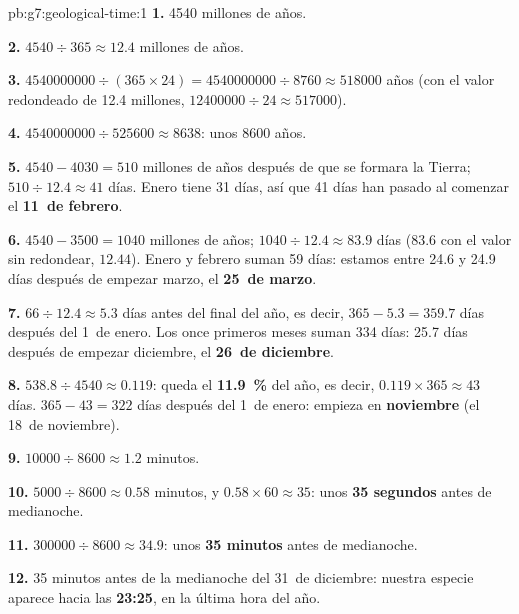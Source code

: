 \begin{solution}{pb:g7:geological-time:1}
\textbf{1.} \num{4540} millones de años.

\textbf{2.} $4540 \div 365 \approx 12.4$ millones de años.

\textbf{3.} $\num{4540000000} \div (365 \times 24) = \num{4540000000}
\div 8760 \approx \num{518000}$ años (con el valor redondeado de \num{12.4}
millones, $\num{12400000} \div 24 \approx \num{517000}$).

\textbf{4.} $\num{4540000000} \div \num{525600} \approx 8638$: unos
\num{8600} años.

\textbf{5.} $4540 - 4030 = 510$ millones de años después de que se formara
la Tierra; $510 \div 12.4 \approx 41$ días. Enero tiene 31 días, así que
41 días han pasado al comenzar el \textbf{11~de febrero}.

\textbf{6.} $4540 - 3500 = 1040$ millones de años; $1040 \div 12.4 \approx
83.9$ días (83.6 con el valor sin redondear, $12.44$). Enero y
febrero suman 59 días: estamos entre 24.6 y 24.9 días después de empezar marzo,
el \textbf{25~de marzo}.

\textbf{7.} $66 \div 12.4 \approx 5.3$ días antes del final del año, es
decir, $365 - 5.3 = 359.7$ días después del 1~de enero. Los once primeros
meses suman 334 días: 25.7 días después de empezar diciembre, el
\textbf{26~de diciembre}.

\textbf{8.} $538.8 \div 4540 \approx 0.119$: queda el \textbf{11.9~\%} del
año, es decir, $0.119 \times 365 \approx 43$ días. $365 - 43 =
322$ días después del 1~de enero: empieza en \textbf{noviembre} (el
18~de noviembre).

\textbf{9.} $\num{10000} \div 8600 \approx 1.2$ minutos.

\textbf{10.} $5000 \div 8600 \approx 0.58$ minutos, y $0.58 \times 60
\approx 35$: unos \textbf{35 segundos} antes de medianoche.

\textbf{11.} $\num{300000} \div 8600 \approx 34.9$: unos \textbf{35
minutos} antes de medianoche.

\textbf{12.} 35 minutos antes de la medianoche del 31~de diciembre: nuestra
especie aparece hacia las \textbf{23:25}, en la última hora del año.
\end{solution}
